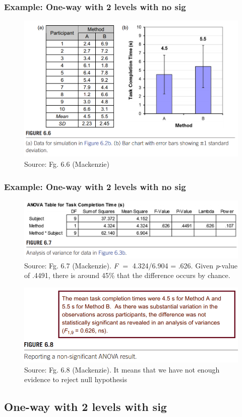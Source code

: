 \documentclass{beamer}
\begin{document}
\begin{frame}
	\frametitle{Example: One-way with 2 levels with no sig} 
	\begin{figure}
		\includegraphics[width=0.8\linewidth]{resultb}
		\caption{Source: Fg. 6.6 (Mackenzie)}
	\end{figure}
\end{frame}


\begin{frame}
	\frametitle{Example: One-way with 2 levels with no sig} 
	\begin{figure}
		\includegraphics[width=0.55\linewidth]{resultb2}
		\caption{Source: Fg. 6.7 (Mackenzie). \textit{F} $=$ 4.324/6.904 = .626.  Given \textit{p}-value of .4491, there is around 45\% that the difference occurs by chance.}
	\end{figure}
	\begin{figure}
		\includegraphics[width=0.55\linewidth]{resultb3}
		\caption{Source: Fg. 6.8 (Mackenzie).  It means that we have not enough evidence to reject null hypothesis}
	\end{figure}
\end{frame}

\subsection{One-way with 2 levels with  sig}
\end{document}
